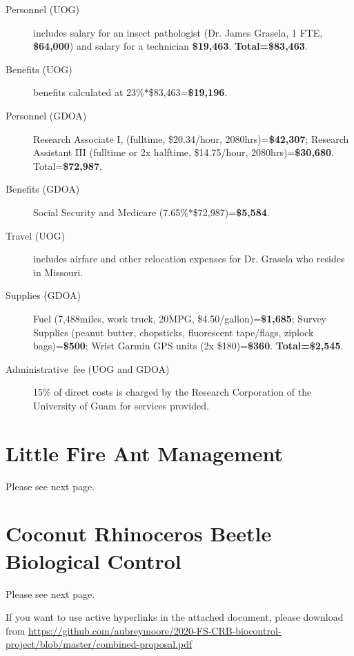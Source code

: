\documentclass[12pt,letterpaper,english,bibliography=totocnumbered, abstract=on]{scrartcl}
\begin{document}
\begin{description}
	
	\item [{Personnel (UOG)}] includes salary for an insect pathologist (Dr. James Grasela, 1 FTE, \textbf{\$64,000}) and salary for a technician \textbf{\$19,463}.
	\textbf{Total=\$83,463}.
	
	\item [{Benefits (UOG)}] benefits calculated at 23\%*\$83,463=\textbf{\$19,196}.

	\item [{Personnel (GDOA)}] Research Associate I, (fulltime, \$20.34/hour, 2080hrs)=\textbf{\$42,307}; 
	Research Assistant III (fulltime or 2x halftime, \$14.75/hour, 2080hrs)=\textbf{\$30,680}. Total=\textbf{\$72,987}.
	
	\item [{Benefits (GDOA)}] Social Security and Medicare (7.65\%*\$72,987)=\textbf{\$5,584}.
	
	\item [{Travel (UOG)}] includes airfare and other relocation expenses for Dr. Grasela who resides in Missouri.
	
	\item [{Supplies (GDOA)}]  
	Fuel (7,488miles, work truck, 20MPG, \$4.50/gallon)=\textbf{\$1,685}; 
	Survey Supplies (peanut butter, chopsticks, fluorescent tape/flags, ziplock bags)=\textbf{\$500}; 
	Wrist Garmin GPS units (2x \$180)=\textbf{\$360}. \textbf{Total=\$2,545}.	
	
	\item [{Administrative~fee (UOG and GDOA)}] 15\% of direct costs
	is charged by the Research Corporation of the University of Guam for
	services provided. 
	
\end{description}


\pagebreak
\section{Little Fire Ant Management}
Please see next page.



\section{Coconut Rhinoceros Beetle Biological Control}
Please see next page.

If you want to use active hyperlinks in the attached document, please download from 
\tiny{\url{https://github.com/aubreymoore/2020-FS-CRB-biocontrol-project/blob/master/combined-proposal.pdf}}
\end{document}
